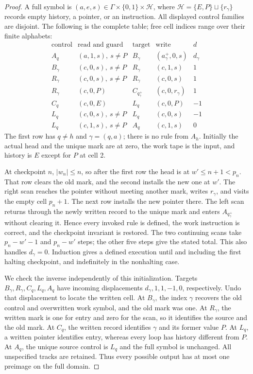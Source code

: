 \begin{proof}\label{ba:persistent-compiler-proof}
A full symbol is $(a,e,s)\in\Gamma\times\{0,1\}\times\mathcal H$,
where $\mathcal H=\{E,P\}\sqcup\{r_\gamma\}$ records empty history,
a pointer, or an instruction.  All displayed control families are
disjoint.  The following is the complete table; free cell indices range
over their finite alphabets:
\[
\begin{array}{c|c|c|c|r}
\text{control}&\text{read and guard}&\text{target}&\text{write}&d\\\hline
A_q&(a,1,s),\ s\ne P&B_\gamma&(a^+_\gamma,0,s)&d_\gamma\\
B_\gamma&(c,0,s),\ s\ne P&R_\gamma&(c,1,s)&1\\
R_\gamma&(c,0,s),\ s\ne P&R_\gamma&(c,0,s)&1\\
R_\gamma&(c,0,P)&C_{q^+_\gamma}&(c,0,r_\gamma)&1\\
C_q&(c,0,E)&L_q&(c,0,P)&-1\\
L_q&(c,0,s),\ s\ne P&L_q&(c,0,s)&-1\\
L_q&(c,1,s),\ s\ne P&A_q&(c,1,s)&0
\end{array}
\]
The first row has $q\ne h$ and $\gamma=(q,a)$; there is no rule from
$A_h$.  Initially the actual head and the unique mark are at zero,
the work tape is the input, and history is $E$ except for $P$ at cell 2.

At checkpoint $n$, $|w_n|\le n$, so after the first row the head is at
$w'\le n+1<p_n$.  That row clears the old mark, and the second installs
the new one at $w'$.  The right scan reaches the pointer without meeting
another mark, writes $r_\gamma$, and visits the empty cell $p_n+1$.
The next row installs the new pointer there.  The left scan returns
through the newly written record to the unique mark and enters
$A_{q^+_\gamma}$ without clearing it.  Hence every invoked rule is
defined, the work instruction is correct, and the checkpoint invariant
is restored.  The two continuing scans take $p_n-w'-1$ and $p_n-w'$
steps; the other five steps give the stated total.  This also handles
$d_\gamma=0$.  Induction gives a defined execution until and including
the first halting checkpoint, and indefinitely in the nonhalting case.

We check the inverse independently of this initialization.  Targets
$B_\gamma,R_\gamma,C_q,L_q,A_q$ have incoming displacements
$d_\gamma,1,1,-1,0$, respectively.  Undo that displacement to locate
the written cell.  At $B_\gamma$, the index $\gamma$ recovers the old
control and overwritten work symbol, and the old mark was one.  At
$R_\gamma$, the written mark is one for entry and zero for the scan,
so it identifies the source and the old mark.  At $C_q$, the written
record identifies $\gamma$ and its former value $P$.  At $L_q$, a
written pointer identifies entry, whereas every loop has history
different from $P$.  At $A_q$, the unique source control is $L_q$ and
the full symbol is unchanged.  All unspecified tracks are retained.
Thus every possible output has at most one preimage on the full domain.
\end{proof}

